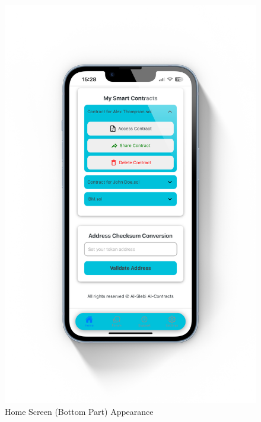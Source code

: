 \begin{figure}[!ht]
\begin{minipage}{0.49\textwidth}
        \includegraphics[scale=0.07]{LATEX/Appendices/Images/Software/Frontend/home_screen_2.png}
        \caption{Home Screen (Bottom Part) Appearance}
        \label{fig:home screen 2}
    \end{minipage}
\end{figure}

